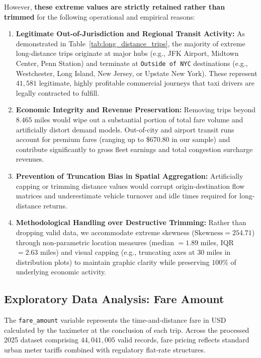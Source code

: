 \documentclass[11pt,a4paper]{article}
\begin{document}
However, \textbf{these extreme values are strictly retained rather than trimmed} for the following operational and empirical reasons:
\begin{enumerate}
    \item \textbf{Legitimate Out-of-Jurisdiction and Regional Transit Activity:} As demonstrated in Table~\ref{tab:long_distance_trips}, the majority of extreme long-distance trips originate at major hubs (e.g., JFK Airport, Midtown Center, Penn Station) and terminate at \texttt{Outside of NYC} destinations (e.g., Westchester, Long Island, New Jersey, or Upstate New York). These represent $41,581$ legitimate, highly profitable commercial journeys that taxi drivers are legally contracted to fulfill.
    \item \textbf{Economic Integrity and Revenue Preservation:} Removing trips beyond $8.465$ miles would wipe out a substantial portion of total fare volume and artificially distort demand models. Out-of-city and airport transit runs account for premium fares (ranging up to \$670.80 in our sample) and contribute significantly to gross fleet earnings and total congestion surcharge revenues.
    \item \textbf{Prevention of Truncation Bias in Spatial Aggregation:} Artificially capping or trimming distance values would corrupt origin-destination flow matrices and underestimate vehicle turnover and idle times required for long-distance returns.
    \item \textbf{Methodological Handling over Destructive Trimming:} Rather than dropping valid data, we accommodate extreme skewness ($\text{Skewness} = 254.71$) through non-parametric location measures (median $= 1.89$ miles, IQR $= 2.63$ miles) and visual capping (e.g., truncating axes at $30$ miles in distribution plots) to maintain graphic clarity while preserving $100\%$ of underlying economic activity.
\end{enumerate}


\subsection{Exploratory Data Analysis: Fare Amount}
\label{sec:eda_fare_amount}

The \texttt{fare\_amount} variable represents the time-and-distance fare in USD calculated by the taximeter at the conclusion of each trip. Across the processed 2025 dataset comprising $44,041,005$ valid records, fare pricing reflects standard urban meter tariffs combined with regulatory flat-rate structures.
\end{document}
